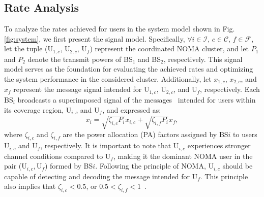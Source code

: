 \documentclass[conference]{IEEEtran}
\begin{document}
\subsection{Rate Analysis}
To analyze the rates achieved for users in the system model shown in Fig. \ref{fig:system}, we first present the signal model. Specifically, $\forall i \in \mathcal{I}$, $c \in \mathcal{C}$, $f \in \mathcal{F}$, let the tuple (U$_{1,c}$, U$_{2,c}$, U$_f$) represent the coordinated NOMA cluster, and let $P_1$ and $P_2$ denote the transmit powers of BS$_1$ and BS$_2$, respectively. This signal model serves as the foundation for evaluating the achieved rates and optimizing the system performance in the considered cluster. Additionally, let $x_{1,c}$, $x_{2,c}$, and $x_f$ represent the message signal intended for U$_{1,c}$, U$_{2,c}$, and U$_f$, respectively. Each BS$_i$ broadcasts a superimposed signal of the messages~\cite{saito2013non} intended for users within its coverage region, U$_{i,c}$ and U$_f$, and expressed as:
\begin{equation}
    x_{i}=\sqrt{\zeta_{i,c}P_i}x_{i,c} + \sqrt{\zeta_{i,f}P_i}x_f,
\end{equation}
where $\zeta_{i,c}$ and $\zeta_{i,f}$ are the power allocation (PA) factors assigned by BS$i$ to users U$_{i,c}$ and U$_f$, respectively. It is important to note that U$_{i,c}$ experiences stronger channel conditions compared to U$_f$, making it the dominant NOMA user in the pair ($\text{U}_{i,c}, \text{U}_f$) formed by BS$i$. Following the principle of NOMA, U$_{i,c}$ should be capable of detecting and decoding the message intended for U$_f$. This principle also implies that $\zeta_{i,c} < 0.5$, or $0.5 < \zeta_{i,f} < 1$~\cite{obeed2020user, salem2020noma}.
\end{document}
